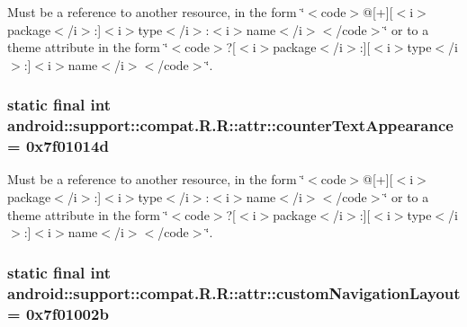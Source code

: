 Must be a reference to another resource, in the form \char`\"{}$<$code$>$@\mbox{[}+\mbox{]}\mbox{[}$<$i$>$package$<$/i$>$:\mbox{]}$<$i$>$type$<$/i$>$:$<$i$>$name$<$/i$>$$<$/code$>$\char`\"{} or to a theme attribute in the form \char`\"{}$<$code$>$?\mbox{[}$<$i$>$package$<$/i$>$:\mbox{]}\mbox{[}$<$i$>$type$<$/i$>$:\mbox{]}$<$i$>$name$<$/i$>$$<$/code$>$\char`\"{}. \hypertarget{classandroid_1_1support_1_1compat_1_1_r_1_1attr_4f6a4c49efab0742494ae81faaef1d8f}{
\subsubsection[{counterTextAppearance}]{\setlength{\rightskip}{0pt plus 5cm}static final int android::support::compat.R.R::attr::counterTextAppearance = 0x7f01014d}}
\label{classandroid_1_1support_1_1compat_1_1_r_1_1attr_4f6a4c49efab0742494ae81faaef1d8f}


Must be a reference to another resource, in the form \char`\"{}$<$code$>$@\mbox{[}+\mbox{]}\mbox{[}$<$i$>$package$<$/i$>$:\mbox{]}$<$i$>$type$<$/i$>$:$<$i$>$name$<$/i$>$$<$/code$>$\char`\"{} or to a theme attribute in the form \char`\"{}$<$code$>$?\mbox{[}$<$i$>$package$<$/i$>$:\mbox{]}\mbox{[}$<$i$>$type$<$/i$>$:\mbox{]}$<$i$>$name$<$/i$>$$<$/code$>$\char`\"{}. \hypertarget{classandroid_1_1support_1_1compat_1_1_r_1_1attr_ec9c4ebaed78e4ca6a1557230b9f7865}{
\subsubsection[{customNavigationLayout}]{\setlength{\rightskip}{0pt plus 5cm}static final int android::support::compat.R.R::attr::customNavigationLayout = 0x7f01002b}}
\label{classandroid_1_1support_1_1compat_1_1_r_1_1attr_ec9c4ebaed78e4ca6a1557230b9f7865}



